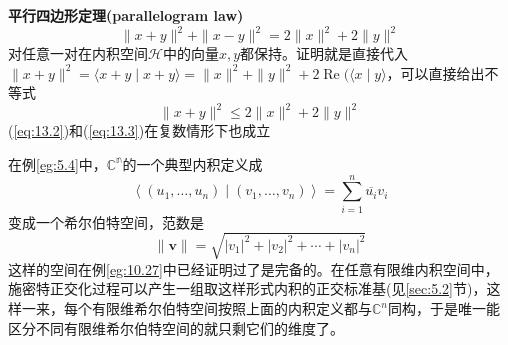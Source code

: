 \textbf{平行四边形定理(parallelogram law)}
\begin{equation}
    \|x+y\|^{2}+\|x-y\|^{2}=2\|x\|^{2}+2\|y\|^{2}\label{eq:13.2}
\end{equation}
对任意一对在内积空间\(\mathcal{H}\)中的向量\(x,y\)都保持。证明就是直接代入$\|x+y\|^{2}=\langle x+y \mid x+y\rangle=\|x\|^{2}+\|y\|^{2}+2 \operatorname{Re}(\langle x \mid y\rangle$，可以直接给出不等式
\begin{equation}
    \|x+y\|^{2} \leq 2\|x\|^{2}+2\|y\|^{2}\label{eq:13.3}
\end{equation}
(\ref{eq:13.2})和(\ref{eq:13.3})在复数情形下也成立
\begin{eg}
    在例\ref{eg:5.4}中，\(\mathbb{C^n}\)的一个典型内积定义成
    $$
\left\langle\left(u_{1}, \ldots, u_{n}\right) \mid\left(v_{1}, \ldots, v_{n}\right)\right\rangle=\sum_{i=1}^{n} \overline{u_{i}} v_{i}
$$
变成一个希尔伯特空间，范数是
$$
\|\mathbf{v}\|=\sqrt{\left|v_{1}\right|^{2}+\left|v_{2}\right|^{2}+\cdots+\left|v_{n}\right|^{2}}
$$
这样的空间在例\ref{eg:10.27}中已经证明过了是完备的。在任意有限维内积空间中，施密特正交化过程可以产生一组取这样形式内积的正交标准基(见\ref{sec:5.2}节)，这样一来，每个有限维希尔伯特空间按照上面的内积定义都与\(\mathbb{C}^n\)同构，于是唯一能区分不同有限维希尔伯特空间的就只剩它们的维度了。
\end{eg}
